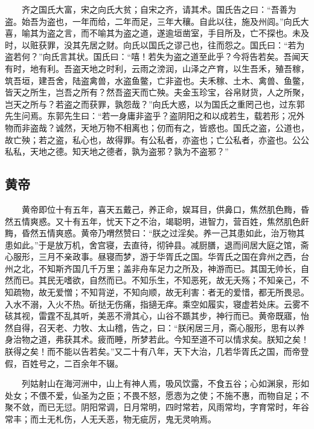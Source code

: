 　　齐之国氏大富，宋之向氏大贫；自宋之齐，请其术。国氏告之曰：``吾善为盗。始吾为盗也，一年而给，二年而足，三年大穰。自此以往，施及州闾。''向氏大喜，喻其为盗之言，而不喻其为盗之道，遂逾垣凿室，手目所及，亡不探也。未及时，以赃获罪，没其先居之财。向氏以国氏之谬己也，往而怨之。国氏曰：``若为盗若何？''向氏言其状。国氏曰：``嘻！若失为盗之道至此乎？今将告若矣。吾闻天有时，地有利。吾盗天地之时利，云雨之滂润，山泽之产育，以生吾禾，殖吾稼，筑吾垣，建吾舍，陆盗禽兽，水盗鱼鳖，亡非盗也。夫禾稼、土木、禽兽、鱼鳖，皆天之所生，岂吾之所有？然吾盗天而亡殃。夫金玉珍宝，谷帛财货，人之所聚，岂天之所与？若盗之而获罪，孰怨哉？''向氏大惑，以为国氏之重罔己也，过东郭先生问焉。东郭先生曰：``若一身庸非盗乎？盗阴阳之和以成若生，载若形；况外物而非盗哉？诚然，天地万物不相离也；仞而有之，皆惑也。国氏之盗，公道也，故亡殃；若之盗，私心也，故得罪。有公私者，亦盗也；亡公私者，亦盗也。公公私私，天地之德。知天地之德者，孰为盗邪？孰为不盗邪？''

\hypertarget{ux9ec4ux5e1d}{%
\subsection{黄帝}\label{ux9ec4ux5e1d}}

　　黄帝即位十有五年，喜天五戴己，养正命，娱耳目，供鼻口，焦然肌色黣，昏然五情爽惑。又十有五年，忧天下之不治，竭聪明，进智力，营百姓，焦然肌色皯黣，昏然五情爽惑。黄帝乃喟然赞曰：``朕之过淫矣。养一己其患如此，治万物其患如此。''于是放万机，舍宫寝，去直待，彻钟县。减厨膳，退而间居大庭之馆，斋心服形，三月不亲政事。昼寝而梦，游于华胥氏之国。华胥氏之国在弇州之西，台州之北，不知斯齐国几千万里；盖非舟车足力之所及，神游而已。其国无帅长，自然而已。其民无嗜欲，自然而已。不知乐生，不知恶死，故无夭殇；不知亲己，不知疏物，故无爱憎；不知背逆，不知向顺，故无利害：者无的爱惜，都无所畏忌。入水不溺，入火不热。斫挞无伤痛，指擿无痒。乘空如履实，寝虚若处床。云雾不硋其视，雷霆不乱其听，美恶不滑其心，山谷不踬其步，神行而已。黄帝既寤，怡然自得，召天老、力牧、太山稽，告之，曰：``朕闲居三月，斋心服形，思有以养身治物之道，弗获其术。疲而睡，所梦若此。今知至道不可以情求矣。朕知之矣！朕得之矣！而不能以告若矣。''又二十有八年，天下大治，几若华胥氏之国，而帝登假，百姓号之，二百余年不辍。

　　列姑射山在海河洲中，山上有神人焉，吸风饮露，不食五谷；心如渊泉，形如处女；不偎不爱，仙圣为之臣；不畏不怒，愿悫为之使；不施不惠，而物自足；不聚不敛，而已无愆。阴阳常调，日月常明，四时常若，风雨常均，字育常时，年谷常丰；而土无札伤，人无夭恶，物无疵厉，鬼无灵响焉。

